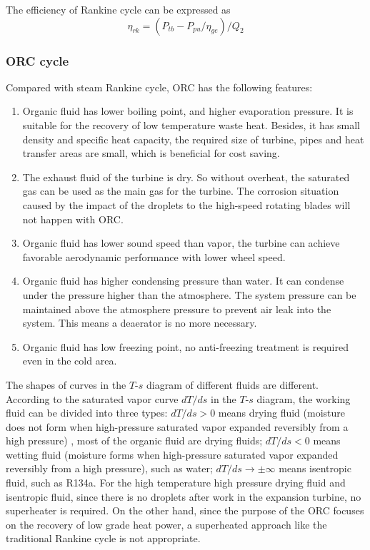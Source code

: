 The efficiency of Rankine cycle can be expressed as
\begin{equation}
	\eta_{rk}=(P_{tb}-P_{pu}/\eta_{ge})/Q_{2}
\end{equation}

  \subsubsection{ORC cycle}
  
  Compared with steam Rankine cycle, ORC has the following features:
  \begin{enumerate}
  \item Organic fluid has lower boiling point, and higher evaporation pressure. It is suitable for the recovery of low temperature waste heat. Besides, it has small density and specific heat capacity, the required size of turbine, pipes and heat transfer areas are small, which is beneficial for cost saving.
  \item The exhaust fluid of the turbine is dry. So without overheat, the saturated gas can be used as the main gas for the turbine. The corrosion situation caused by the impact of the droplets to the high-speed rotating blades will not happen with ORC.
  \item Organic fluid has lower sound speed than vapor, the turbine can achieve favorable aerodynamic performance with lower wheel speed. 
  \item Organic fluid has higher condensing pressure than water. It can condense under the pressure higher than the atmosphere. The system pressure can be maintained above the atmosphere pressure to prevent air leak into the system. This means a deaerator is no more necessary.
  \item Organic fluid has low freezing point, no anti-freezing treatment is required even in the cold area.
\end{enumerate}

The shapes of curves in the $T$-$s$ diagram of different fluids are different. According to the saturated vapor curve $dT/ds$ in the $T$-$s$ diagram, the working fluid can be divided into three types: $dT / ds > 0$ means drying fluid (moisture does not form when high-pressure saturated vapor expanded reversibly from a high pressure) , most of the organic fluid are drying fluids; $dT / ds < 0$ means wetting fluid (moisture forms when high-pressure saturated vapor expanded reversibly from a high pressure), such as water; $dT/ds \rightarrow \pm\infty$ means isentropic fluid, such as R134a. For the high temperature high pressure drying fluid and isentropic fluid, since there is no droplets after work in the expansion turbine, no superheater is required. On the other hand, since the purpose of the ORC focuses on the recovery of low grade heat power, a superheated approach like the traditional Rankine cycle is not appropriate. 

